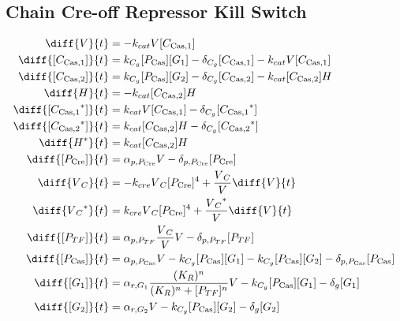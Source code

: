 \subsection{Chain Cre-off Repressor Kill Switch}
\label{s:Chain_Cre_off_Repressor_Kill_Switch}

\begin{align}
\diff{\vectorGen{}}{t} & = - \casCutRate{{}}\vectorGen{}\conc{\cplx{\cas}{1}}\\
\diff{\conc{\cplx{\cas}{1}}}{t} & =  \gRnaBind{}\conc{\proSp{\cas{}}}\conc{\gRna{1}} - \casCompDegradeRate{}\conc{\cplx{\cas}{1}} - \casCutRate{{}}\vectorGen{}\conc{\cplx{\cas}{1}}\\
\diff{\conc{\cplx{\cas}{2}}}{t} & =  \gRnaBind{}\conc{\proSp{\cas{}}}\conc{\gRna{2}} - \casCompDegradeRate{}\conc{\cplx{\cas}{2}} - \casCutRate{{}}\conc{\cplx{\cas}{2}}\hostGen{}\\
\diff{\hostGen{}}{t} & = - \casCutRate{{}}\conc{\cplx{\cas}{2}}\hostGen{}\\
\diff{\conc{\bound{\cplx{\cas}{1}}}}{t} & =  \casCutRate{{}}\vectorGen{}\conc{\cplx{\cas}{1}} - \casCompDegradeRate{}\conc{\bound{\cplx{\cas}{1}}}\\
\diff{\conc{\bound{\cplx{\cas}{2}}}}{t} & =  \casCutRate{{}}\conc{\cplx{\cas}{2}}\hostGen{} - \casCompDegradeRate{}\conc{\bound{\cplx{\cas}{2}}}\\
\diff{\edited{\hostGen{}}}{t} & =  \casCutRate{{}}\conc{\cplx{\cas}{2}}\hostGen{}\\
\diff{\conc{\proSp{\cre{}}}}{t} & =  \txtlRate{\proSp{\cre{}}}\vectorGen{} - \proDegradeRate{\proSp{\cre{}}}\conc{\proSp{\cre{}}}\\
\diff{\vectorGen{}_C}{t} & = - \creCutRate{} \vectorGen{}_C \conc{\proSp{\cre{}}}^4 + \frac{\vectorGen{}_C}{\vectorGen{}} \diff{\vectorGen{}}{t}\\
\diff{\edited{\vectorGen{}_C}}{t} & =  \creCutRate{} \vectorGen{}_C \conc{\proSp{\cre{}}}^4 + \frac{\edited{\vectorGen{}_C}}{\vectorGen{}} \diff{\vectorGen{}}{t}\\
\diff{\conc{\proSp{TF}}}{t} & =  \txtlRate{\proSp{TF}}\frac{\vectorGen{}_C}{\vectorGen{}}\vectorGen{} - \proDegradeRate{\proSp{TF}}\conc{\proSp{TF}}\\
\diff{\conc{\proSp{\cas{}}}}{t} & =  \txtlRate{\proSp{\cas{}}}\vectorGen{} - \gRnaBind{}\conc{\proSp{\cas{}}}\conc{\gRna{1}} - \gRnaBind{}\conc{\proSp{\cas{}}}\conc{\gRna{2}} - \proDegradeRate{\proSp{\cas{}}}\conc{\proSp{\cas{}}}\\
\diff{\conc{\gRna{1}}}{t} & =  \txRate{\gRna{1}}\frac{(K_R)^n}{(K_R)^n + \conc{\proSp{TF}}^n}\vectorGen{} - \gRnaBind{}\conc{\proSp{\cas{}}}\conc{\gRna{1}} - \rnaDegradeRate{}\conc{\gRna{1}}\\
\diff{\conc{\gRna{2}}}{t} & =  \txRate{\gRna{2}}\vectorGen{} - \gRnaBind{}\conc{\proSp{\cas{}}}\conc{\gRna{2}} - \rnaDegradeRate{}\conc{\gRna{2}}
\end{align}

